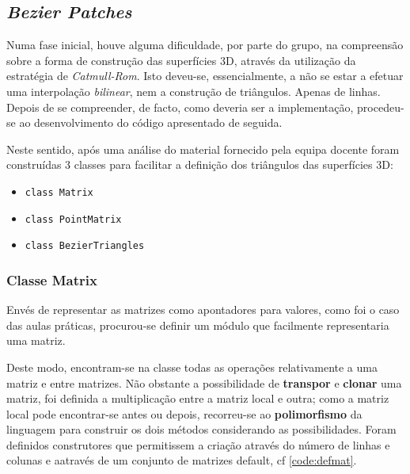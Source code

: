 \documentclass[relatorio.tex]{subfiles}
\begin{document}
    
\subsection{\textit{Bezier Patches}} \label{subsec:bezier_p}

Numa fase inicial, houve alguma dificuldade, por parte do grupo,
na compreensão sobre a forma de construção das superfícies 3D, através da utilização
da estratégia de \textit{Catmull-Rom}.
Isto deveu-se, essencialmente, a não se estar a efetuar uma interpolação \textit{bilinear},
nem a construção de triângulos. Apenas de linhas.
Depois de se compreender, de facto, como  deveria ser a implementação,
procedeu-se ao desenvolvimento do código apresentado de seguida.

Neste sentido, após uma análise do material fornecido pela equipa docente foram construídas 3 classes para facilitar a definição dos triângulos das superfícies 3D:
\begin{itemize}
    \item \texttt{class Matrix}
    \item \texttt{class PointMatrix}
    \item \texttt{class BezierTriangles}
\end{itemize}

\subsubsection{Classe Matrix}
Envés de representar as matrizes como apontadores para valores, como foi o caso das aulas práticas,
procurou-se definir um módulo que facilmente representaria uma matriz. 
\begin{code}
    \label{code:class_matrix}
\end{code}

Deste modo, encontram-se na classe todas as operações relativamente a uma matriz e entre matrizes.
Não obstante a possibilidade de \textbf{transpor} e \textbf{clonar} uma matriz,
foi definida a multiplicação entre a matriz local e outra;
como a matriz local pode encontrar-se antes ou depois,
recorreu-se ao \textbf{polimorfismo} da linguagem para construir os dois métodos 
considerando as possibilidades.
Foram definidos construtores que permitissem a criação através do número de linhas e colunas
e aatravés de um conjunto de matrizes default, cf \ref{code:defmat}.
\end{document}
